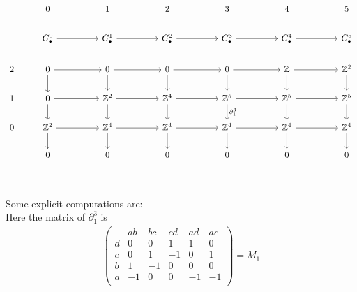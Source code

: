 \documentclass[11pt,a4paper]{report}
\begin{document}
\begin{Ex}
              \[
                \begin{tikzcd}[ampersand replacement=\&, sep=normal]
                  \& 0     \&\& 1    \&\& 2     \&\& 3     \&\& 4     \&\& 5\\
                  \& C_\bullet^0 \arrow[rr] \&\& C_\bullet^1 \arrow[rr] \&\& C_\bullet^2 \arrow[rr] \&\& C_\bullet^3 \arrow[rr] \&\& C_\bullet^4 \arrow[rr] \&\& C_\bullet^5\\
                  2 \& 0 \arrow[d]  \arrow[rr]           \&\& 0 \arrow[d]  \arrow[rr]           \&\& 0 \arrow[d]  \arrow[rr]           \&\& 0 \arrow[d]  \arrow[rr]           \&\& \mathbb{Z} \arrow[rr] \arrow[d]  \&\& \mathbb{Z}^2 \arrow[d]\\
                  1 \& 0 \arrow[d]  \arrow[rr]           \&\& \mathbb{Z}^2 \arrow[rr] \arrow[d] \&\& \mathbb{Z}^4 \arrow[rr] \arrow[d] \&\& \mathbb{Z}^5 \arrow[rr] \arrow[d,"\partial_1^3"] \&\& \mathbb{Z}^5 \arrow[rr] \arrow[d] \&\& \mathbb{Z}^5 \arrow[d]\\
                  0 \& \mathbb{Z}^2 \arrow[rr] \arrow[d] \&\& \mathbb{Z}^4 \arrow[rr] \arrow[d] \&\& \mathbb{Z}^4 \arrow[rr] \arrow[d] \&\& \mathbb{Z}^4 \arrow[rr] \arrow[d] \&\& \mathbb{Z}^4 \arrow[rr] \arrow[d] \&\& \mathbb{Z}^4 \arrow[d]\\
                  \& 0 \&\& 0 \&\& 0 \&\& 0 \&\& 0 \&\& 0\\
                \end{tikzcd}
              \]
              \\
              Some explicit computations are: \\
              Here the matrix of $\partial_1^3$ is\\
              \begin{align*}
                \left(\begin{array}{c|ccccc}
                        &ab&bc&cd&ad&ac\\\hline
                        d&0&0&1&1&0\\
                        c&0&1&-1&0&1\\
                        b&1&-1&0&0&0\\
                        a&-1&0&0&-1&-1\\
                      \end{array}\right) = M_1
              \end{align*}
              \end{Ex}
\end{document}

